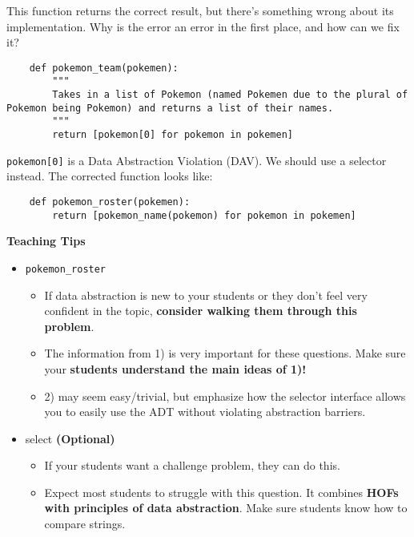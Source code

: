     
    \begin{blocksection}
    \question This function returns the correct result, but there's something wrong
    about its implementation. Why is the error an error in the first place, and how can we fix it?
    
    \begin{lstlisting}
    def pokemon_team(pokemen):
        """
        Takes in a list of Pokemon (named Pokemen due to the plural of Pokemon being Pokemon) and returns a list of their names.
        """
        return [pokemon[0] for pokemon in pokemen]
    \end{lstlisting}
    \begin{solution}[1in]
    \lstinline{pokemon[0]} is a Data Abstraction Violation (DAV).
    We should use a selector instead.
    The corrected function looks like:
    \begin{lstlisting}
    def pokemon_roster(pokemen):
        return [pokemon_name(pokemon) for pokemon in pokemen]
    \end{lstlisting}
    \end{solution}
    
    \end{blocksection}
    

    \begin{guide}
    \textbf{Teaching Tips}
    \begin{itemize}
        \item \texttt{pokemon\_roster}
        \begin{itemize}
            \item If data abstraction is new to your students or they don’t feel very confident in the topic, \textbf{consider walking them through this problem}.
            \item The information from 1) is very important for these questions. Make sure your \textbf{students understand the main ideas of 1)!}
            \item 2) may seem easy/trivial, but emphasize how the selector interface allows you to easily use the ADT without violating abstraction barriers.
        \end{itemize}
        \item select \textbf{(Optional)}
        \begin{itemize}
            \item If your students want a challenge problem, they can do this.
            \item Expect most students to struggle with this question. It combines \textbf{HOFs with principles of data abstraction}. Make sure students know how to compare strings.
        \end{itemize}
    \end{itemize}
    \end{guide}
        

